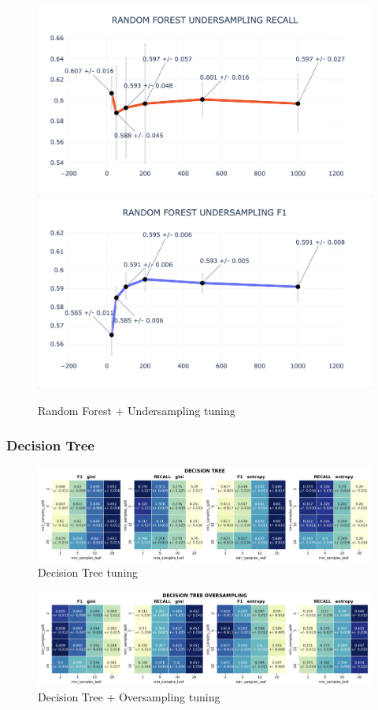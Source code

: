 \documentclass{article}
\begin{document}
	\begin{figure}[H]
		\centering
		\includegraphics[width=.49\textwidth]{clf_img/RF_US_recall.png}
		\includegraphics[width=.49\textwidth]{clf_img/RF_US_f1.png}
		\caption{Random Forest + Undersampling tuning}
		\label{fig:hyper_rf_us}
	\end{figure}
	
	
	\subsubsection{Decision Tree}
	\begin{figure}[H]
		\centering
		\includegraphics[width=.9\textwidth]{clf_img/DecisionTree.png}
		\caption{Decision Tree tuning}
		\label{fig:hyper_dectree}
	\end{figure}
	
	\begin{figure}[H]
		\centering
		\includegraphics[width=.9\textwidth]{clf_img/DecisionTree_OS.png}
		\caption{Decision Tree + Oversampling tuning}
		\label{fig:hyper_dectreeOS}
	\end{figure}
	
\end{document}
